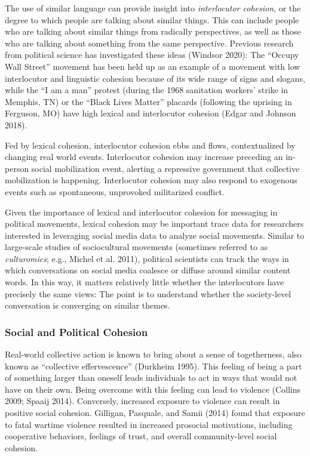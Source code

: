 \documentclass[english,man]{apa6}
\begin{document}
The use of similar language can provide insight into \emph{interlocutor cohesion}, or
the degree to which people are talking about similar things. This can include
people who are talking about similar things from radically perspectives, as well
as those who are talking about something from the same perspective. Previous
research from political science has investigated these ideas (Windsor 2020): The
\enquote{Occupy Wall Street} movement has been held up as an example of a movement with
low interlocutor and linguistic cohesion because of its wide range of signs and
slogans, while the \enquote{I am a man} protest (during the 1968 sanitation workers'
strike in Memphis, TN) or the \enquote{Black Lives Matter} placards (following the
uprising in Ferguson, MO) have high lexical and interlocutor cohesion
(Edgar and Johnson 2018).

Fed by lexical cohesion, interlocutor cohesion ebbs and flows, contextualized by
changing real world events. Interlocutor cohesion may increase preceding an
in-person social mobilization event, alerting a repressive government that
collective mobilization is happening. Interlocutor cohesion may also respond to
exogenous events such as spontaneous, unprovoked militarized conflict.

Given the importance of lexical and interlocutor cohesion for messaging in
political movements, lexical cohesion may be important trace data for
researchers interested in leveraging social media data to analyze social
movements. Similar to large-scale studies of sociocultural movements (sometimes
referred to as \emph{culturomics}; e.g., Michel et al. 2011), political
scientists can track the ways in which conversations on social media coalesce or
diffuse around similar content words. In this way, it matters relatively little
whether the interlocutors have precisely the same views: The point is to
understand whether the society-level conversation is converging on similar
themes.

\hypertarget{social-and-political-cohesion}{%
\subsubsection{Social and Political Cohesion}\label{social-and-political-cohesion}}

Real-world collective action is known to bring about a sense of togetherness,
also known as \enquote{collective effervescence} (Durkheim 1995). This feeling
of being a part of something larger than oneself leads individuals to act in
ways that would not have on their own. Being overcome with this feeling can lead
to violence (Collins 2009; Spaaij 2014). Conversely, increased
exposure to violence can result in positive social cohesion. Gilligan, Pasquale, and Samii (2014)
found that exposure to fatal wartime violence resulted in increased prosocial
motivations, including cooperative behaviors, feelings of trust, and overall
community-level social cohesion.
\end{document}
